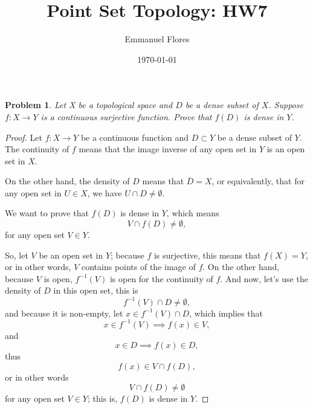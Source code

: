 \documentclass[11pt]{article}
\title{Point Set Topology: HW7}
\author{Emmanuel Flores}
\date{\today}
\newtheorem{problem}{Problem}
\newtheorem{proof}{Proof}
\begin{document}
\maketitle
\begin{problem}
Let X be a topological space and $D$ be a dense subset of $X$. Suppose $f: X \rightarrow Y$ is a continuous surjective function. Prove that $f(D)$ is dense in $Y$.
\end{problem}
\begin{proof}
	Let $f: X \rightarrow Y$ be a continuous function and $D\subset Y$ be a dense subset of $Y$. The continuity of $f$ means that the image inverse of any open set in $Y$ is an open set in $X$. 
	
	On the other hand, the density of $D$ means that $\overline{D}=X$, or equivalently, that for any open set in $U\in X$, we have $U\cap D\neq \emptyset$. 
	
	We want to prove that $f(D)$ is dense in $Y$, which means
\begin{displaymath}
V\cap  f(D)\neq \emptyset,
\end{displaymath}
for any open set $V\in Y$.

So, let $V$ be an open set in $Y$; because $f$ is surjective, this means that $f(X)=Y$, or in other words, $V$ contains points of the image of $f$. On the other hand, because $V$ is open, $f^{-1}(V)$ is open for the continuity of $f$. And now, let's use the density of $D$ in this open set, this is
\begin{displaymath}
  f^{-1}(V)\cap D \neq \emptyset,
\end{displaymath}
and because it is non-empty, let $x\in f^{-1}(V)\cap D$, which implies that 
\begin{displaymath}
  x\in f^{-1}(V)\implies f(x)\in V,
\end{displaymath}
and
\begin{displaymath}
  x\in D\implies f(x)\in D,
\end{displaymath}
thus 
\begin{displaymath}
  f(x)\in V\cap f(D),
\end{displaymath}
or in other words
\begin{displaymath}
   V\cap f(D)\neq \emptyset
\end{displaymath}
for any open set $V\in Y$; this is, $f(D)$ is dense in $Y$.
\end{proof}
\pagebreak
\end{document}
